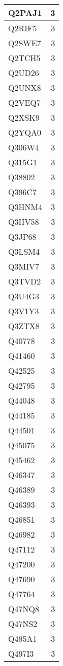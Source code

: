 \documentclass[
]{book}
\theoremstyle{definition}
\theoremstyle{definition}
\theoremstyle{definition}
\theoremstyle{definition}
\theoremstyle{remark}
\begin{document}
\begin{table}
\begin{tabular}{l|r}
\hline
Q2PAJ1 & 3\\
\hline
Q2RIF5 & 3\\
\hline
Q2SWE7 & 3\\
\hline
Q2TCH5 & 3\\
\hline
Q2UD26 & 3\\
\hline
Q2UNX8 & 3\\
\hline
Q2VEQ7 & 3\\
\hline
Q2XSK9 & 3\\
\hline
Q2YQA0 & 3\\
\hline
Q306W4 & 3\\
\hline
Q315G1 & 3\\
\hline
Q38802 & 3\\
\hline
Q396C7 & 3\\
\hline
Q3HNM4 & 3\\
\hline
Q3HV58 & 3\\
\hline
Q3JP68 & 3\\
\hline
Q3LSM4 & 3\\
\hline
Q3MIV7 & 3\\
\hline
Q3TVD2 & 3\\
\hline
Q3U4G3 & 3\\
\hline
Q3V1Y3 & 3\\
\hline
Q3ZTX8 & 3\\
\hline
Q40778 & 3\\
\hline
Q41460 & 3\\
\hline
Q42525 & 3\\
\hline
Q42795 & 3\\
\hline
Q44048 & 3\\
\hline
Q44185 & 3\\
\hline
Q44501 & 3\\
\hline
Q45075 & 3\\
\hline
Q45462 & 3\\
\hline
Q46347 & 3\\
\hline
Q46389 & 3\\
\hline
Q46393 & 3\\
\hline
Q46851 & 3\\
\hline
Q46982 & 3\\
\hline
Q47112 & 3\\
\hline
Q47200 & 3\\
\hline
Q47690 & 3\\
\hline
Q47764 & 3\\
\hline
Q47NQ8 & 3\\
\hline
Q47NS2 & 3\\
\hline
Q495A1 & 3\\
\hline
Q497I3 & 3\\

\end{tabular}
\end{table}
\end{document}
